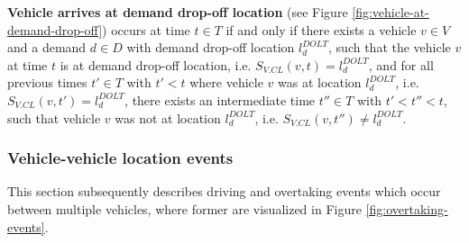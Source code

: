 \documentclass[graybox]{svmult}
\begin{document}
\vspace{2mm}
\noindent \textbf{Vehicle arrives at demand drop-off location} (see Figure \ref{fig:vehicle-at-demand-drop-off}) occurs at time $t \in T$ if and only if there exists a vehicle $v \in V$ and a demand $d \in D$ with demand drop-off location $l_d^{DOLT}$, such that the vehicle $v$ at time $t$ is at demand drop-off location, i.e. $S_{V.CL}(v, t) = l_d^{DOLT}$, and for all previous times $t' \in T$ with $t' < t$ where vehicle $v$ was at location $l_d^{DOLT}$, i.e. $S_{V.CL}(v, t') = l_d^{DOLT}$, there exists an intermediate time $t'' \in T$ with $t' < t'' < t$, such that vehicle $v$ was not at location $l_d^{DOLT}$, i.e. $S_{V.CL}(v, t'') \neq l_d^{DOLT}$.

\subsubsection{Vehicle-vehicle location events}
\label{sec:vehicle-location-events}

This section subsequently describes driving and overtaking events which occur between multiple vehicles, where former are visualized in Figure \ref{fig:overtaking-events}.
\end{document}
